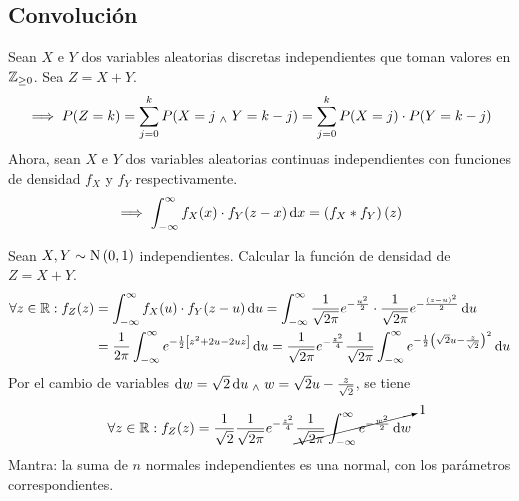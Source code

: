 

\subsection{Convolución}

Sean $X$ e $Y$ dos variables aleatorias discretas independientes que toman valores en $\mathbb{Z}_{\geq 0}$. Sea $Z = X + Y$.
\[\implies P(Z = k) = \sum_{j=0}^{k} P(X = j \; _{\wedge} \; Y = k-j) = \sum_{j=0}^{k} P(X = j) \cdot P(Y = k-j)\]
Ahora, sean $X$ e $Y$ dos variables aleatorias continuas independientes con funciones de densidad $f_X$ y $f_Y$ respectivamente.
\[\implies \int_{-\infty}^{\infty} f_{X}(x) \cdot f_{Y}(z-x) \odif{x} = \left(f_{X} * f_{Y}\right) (z)\] %

\begin{ejem}
	Sean $X, Y \sim \operatorname{N}\left(0, 1\right)$ independientes. Calcular la función de densidad de $Z = X + Y$.
	\[\begin{aligned}
			\forall z \in \R : f_Z(z) & = \int_{-\infty}^{\infty} f_X(u) \cdot f_Y(z-u) \odif{u} = \int_{-\infty}^{\infty} \frac{1}{\sqrt{2\pi}} e^{-\frac{u^2}{2}} \cdot \frac{1}{\sqrt{2\pi}} e^{-\frac{(z-u)^2}{2}} \odif{u}                                                                       \\
			                          & = \frac{1}{2\pi} \int_{-\infty}^{\infty} e^{-\frac{1}{2}\left[z^2 + 2u - 2uz\right]} \odif{u} = \frac{1}{\sqrt{2\pi}} e^{-\frac{z^2}{4}} \frac{1}{\sqrt{2\pi}} \int_{-\infty}^{\infty} e^{-\frac{1}{2}\left(\sqrt{2}u - \frac{z}{\sqrt{2}}\right)^2} \odif{u} \\
		\end{aligned}\]
	Por el cambio de variables $\odif{w} = \sqrt{2} \odif{u} \we w = \sqrt{2} u - \frac{z}{\sqrt{2}}$, se tiene
	\[\forall z \in \R : f_Z(z) = \frac{1}{\sqrt{2}} \frac{1}{\sqrt{2\pi}} e^{-\frac{z^2}{4}} \cancelto{1}{\frac{1}{\sqrt{2\pi}} \int_{-\infty}^{\infty} e^{-\frac{w^2}{2}} \odif{w}}\]
	Mantra: la suma de $n$ normales independientes es una normal, con los parámetros correspondientes.
\end{ejem}

